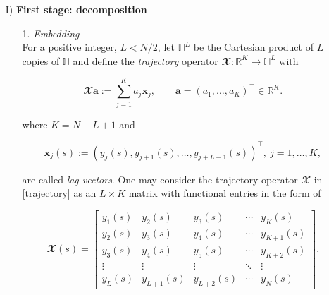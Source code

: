 \begin{itemize}

\item[I)] \textbf{First stage: decomposition}

\begin{itemize}

\item[1.]  \textit{Embedding} \\ For a positive integer, $L<N/2$, let $\mathbb{H}^L$ be the Cartesian product of $L$ copies of $\mathbb{H}$ and define the \textit{trajectory} operator $\mathbfcal{X}:\mathbb{R}^{K} \rightarrow \mathbb{H}^{L}$ with

	\begin{equation}\label{trajectory}

		\mathbfcal{X}{\pmb a}:=\sum_{j=1}^K a_j{\pmb x}_j,\qquad

		{\pmb a}=\left(a_1,\ldots, a_K\right)^\top \in\mathbb{R}^K.

	\end{equation}

	where $K=N-L+1$ and 

	\begin{equation}\label{flvec}

		{\pmb x}_j(s):= \left( y_j(s), y_{j+1}(s), \ldots, y_{j+L-1}(s)\right)^\top,\ j=1,\ldots, K,

	\end{equation}

	are called \textit{lag-vectors}. One may consider the trajectory operator $\mathbfcal{X}$ in \eqref{trajectory} as an $L \times K$ matrix with functional entries in the form of	

	\begin{equation}\label{eqn:hankelmat}

		\mathbfcal{X}(s) = \begin{bmatrix}y_{1}(s) & y_{2}(s) & y_{3}(s) & \cdots & y_{K}(s) \\ y_{2}(s) & y_{3}(s) & y_{4}(s) & \cdots & y_{K+1}(s) \\ y_{3}(s) & y_{4}(s) & y_{5}(s) & \cdots & y_{K+2}(s) \\ \vdots  & \vdots & \vdots & \ddots & \vdots \\ y_{L}(s) & y_{L+1}(s) & y_{L+2}(s) & \cdots & y_{N}(s)  \end{bmatrix}.

	\end{equation}


\end{itemize}
\end{itemize}
